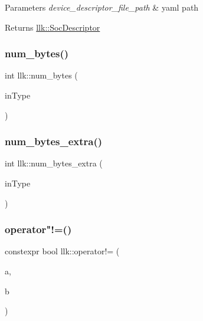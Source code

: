 \begin{DoxyParams}{Parameters}
{\em device\+\_\+descriptor\+\_\+file\+\_\+path} & yaml path \\
\hline
\end{DoxyParams}
\begin{DoxyReturn}{Returns}
\hyperlink{structllk_1_1SocDescriptor}{llk\+::\+Soc\+Descriptor} 
\end{DoxyReturn}
\mbox{\label{namespacellk_aede7298fde3871110bbe72268aeac557}} 
\subsubsection{\texorpdfstring{num\+\_\+bytes()}{num\_bytes()}}
{\footnotesize\ttfamily int llk\+::num\+\_\+bytes (\begin{DoxyParamCaption}\item[{const Data\+Format}]{in\+Type }\end{DoxyParamCaption})}

\mbox{\label{namespacellk_ad38ed2c0bc96eb57b9141ec67ae3988a}} 
\subsubsection{\texorpdfstring{num\+\_\+bytes\+\_\+extra()}{num\_bytes\_extra()}}
{\footnotesize\ttfamily int llk\+::num\+\_\+bytes\+\_\+extra (\begin{DoxyParamCaption}\item[{const Data\+Format}]{in\+Type }\end{DoxyParamCaption})}

\mbox{\label{namespacellk_a9bf058100a0317833cd763f8f2e74fbf}} 
\subsubsection{\texorpdfstring{operator"!=()}{operator!=()}}
{\footnotesize\ttfamily constexpr bool llk\+::operator!= (\begin{DoxyParamCaption}\item[{const \hyperlink{structllk_1_1xy__pair}{xy\+\_\+pair} \&}]{a,  }\item[{const \hyperlink{structllk_1_1xy__pair}{xy\+\_\+pair} \&}]{b }\end{DoxyParamCaption})\hspace{0.3cm}{\ttfamily [inline]}}

